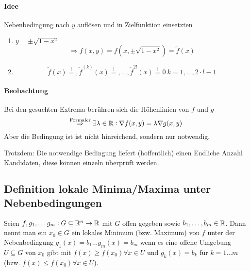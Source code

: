 \paragraph{Idee}
Nebenbedingung nach $y$ auflösen und in Zielfunktion einsetzten
\begin{enumerate}
    \item $y = \pm \sqrt{1-x^2}$
        \begin{equation}
            \Rightarrow f(x,y) = f(x, \pm \sqrt{1-x^2}) = \tilde{f}(x)
        \end{equation}
    \item
        \begin{equation*}
            \tilde{f}(x) \stackrel{!}{=}, \tilde{f}^{(k)}(x) \stackrel{!}{=}, \ldots,
                \tilde{f}^{2l}(x) \stackrel{!}{=} 0\ k=1,\ldots, 2\cdot l - 1
        \end{equation*}
\end{enumerate}

\paragraph{Beobachtung}
Bei den gesuchten Extrema berühren sich die Höhenlinien von $f$ und $g$
\begin{equation*}
    \stackrel{\text{Formaler}}{\Rightarrow} \exists \lambda \in \mathbb{R}:
    \nabla f(x,y) = \lambda \nabla g(x,y)
\end{equation*}
Aber die Bedingung ist ist nicht hinreichend, sondern nur notwendig.

Trotzdem: Die notwendige Bedingung liefert (hoffentlich) einen Endliche Anzahl
Kandidaten, diese können einzeln überprüft werden.

\subsection{Definition lokale Minima/Maxima unter Nebenbedingungen}
Seien $f, g_1, \ldots g_m: G \subseteq \mathbb{R}^n \rightarrow \mathbb{R}$ mit $G$ offen
gegeben sowie $b_1, \ldots, b_m \in \mathbb{R}$. Dann nennt man ein $x_0 \in G$ ein
lokales Minimum (bzw. Maximum) von $f$ unter der Nebenbedingung $g_1(x) = b_1
\ldots g_m(x) = b_m$ wenn es eine offene Umgebung $U \subseteq G$ von $x_0$ gibt
mit $f(x) \geq f(x_0) \forall x \in U$  und $g_k(x) = b_k$ für $k=1 \ldots m$
(bzw. $f(x) \leq f(x_0)  \forall x \in U$).

